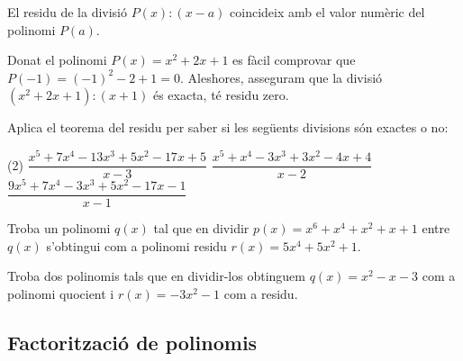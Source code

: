\begin{theorybox}
	El residu de la divisió $P(x):(x-a)$ coincideix amb el valor numèric del polinomi $P(a)$.
\end{theorybox}




\begin{example}
		Donat el polinomi $P(x)=x^2+2x+1$ es fàcil comprovar que $P(-1)=(-1)^2-2+1=0$. Aleshores, asseguram que la divisió $(x^2+2x+1):(x+1)$ és exacta, té residu zero.  
	\vspace{0.25cm}
\end{example}

\begin{mylist}
\exer  Aplica el teorema del residu per saber si les següents divisions són exactes o no:
\begin{tasks}(2)
	\task $\dfrac{x^{5} +7x^{4} -13x^{3} +5x^{2} -17x+5}{x-3} $ \task $\dfrac{x^{5} +x^{4} -3x^{3} +3x^{2} -4x+4}{x-2} $ \task $\dfrac{9x^{5} +7x^{4} -3x^{3} +5x^{2} -17x-1}{x-1} $ 
\end{tasks}
\answers{[$R=458$, $R=32$, $R=0$]}

 
 
 \exer  Troba un polinomi $q(x)$ tal que en dividir $p(x)=x^{6} +x^{4} +x^{2} +x+1$ entre $q(x)$ s'obtingui com a polinomi residu $r(x)=5x^{4} +5x^{2} +1$.  
 
\exer  Troba dos polinomis tals que en dividir-los obtinguem $q(x)=x^{2} -x-3$ com a polinomi quocient i $r(x)=-3x^{2} -1$ com a residu. 

\end{mylist}


\subsection{Factorització de polinomis}

